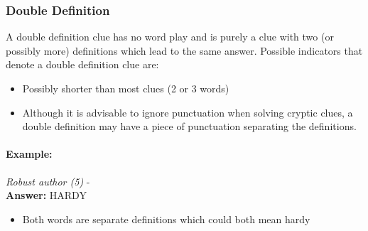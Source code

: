 \subsubsection{Double Definition}

A double definition clue has no word play and is purely a clue with two (or
possibly more) definitions which lead to the same answer. Possible indicators
that denote a double definition clue are:

\begin{itemize} 
    \item Possibly shorter than most clues (2 or 3 words) 
    \item Although it is advisable to ignore punctuation when solving cryptic 
    clues, a double definition may have a piece of punctuation separating the 
    definitions.
\end{itemize}

\paragraph{Example:} \emph{Robust author (5)}  - \citep{shuchiDouble08} \\
\textbf{Answer:} HARDY 

\begin{itemize}
    \item Both words are separate definitions which could both mean hardy 
\end{itemize}

